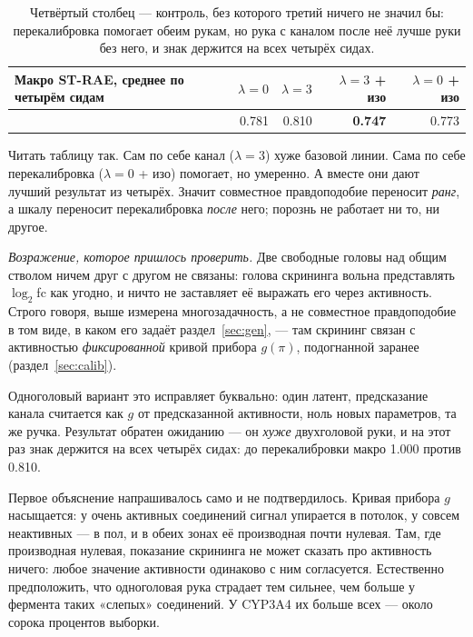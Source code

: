 \begin{table}[htbp]\centering\small
\begin{tabularx}{0.86\textwidth}{@{}Xrrrr@{}}
\toprule
Макро ST-RAE, среднее по четырём сидам & $\lambda=0$ & $\lambda=3$ & $\lambda=3$ + изо & $\lambda=0$ + изо \\
\midrule
& 0.781 & 0.810 & \textbf{0.747} & 0.773 \\
\bottomrule
\end{tabularx}
\caption{Четвёртый столбец --- контроль, без которого третий ничего не значил бы:
перекалибровка помогает обеим рукам, но рука с каналом после неё лучше руки без него,
и знак держится на всех четырёх сидах.}
\label{tab:joint}
\end{table}

Читать таблицу так. Сам по себе канал ($\lambda = 3$) хуже базовой линии. Сама по себе
перекалибровка ($\lambda = 0$ + изо) помогает, но умеренно. А вместе они дают лучший
результат из четырёх. Значит совместное правдоподобие переносит \emph{ранг}, а шкалу
переносит перекалибровка \emph{после} него; порознь не работает ни то, ни другое.

\emph{Возражение, которое пришлось проверить.} Две свободные головы над общим стволом ничем
друг с другом не связаны: голова скрининга вольна представлять $\log_2$fc как угодно, и
ничто не заставляет её выражать его через активность. Строго говоря, выше измерена
многозадачность, а не совместное правдоподобие в том виде, в каком его задаёт
раздел~\ref{sec:gen}, --- там скрининг связан с активностью \emph{фиксированной} кривой
прибора $g(\pi)$, подогнанной заранее (раздел~\ref{sec:calib}).

Одноголовый вариант это исправляет буквально: один латент, предсказание канала считается как
$g$ от предсказанной активности, ноль новых параметров, та же ручка. Результат обратен
ожиданию --- он \emph{хуже} двухголовой руки, и на этот раз знак держится на всех четырёх
сидах: до перекалибровки макро 1.000 против 0.810.

Первое объяснение напрашивалось само и не подтвердилось. Кривая прибора $g$
насыщается: у очень активных соединений сигнал упирается в потолок, у совсем неактивных --- в
пол, и в обеих зонах её производная почти нулевая. Там, где производная нулевая, показание
скрининга не может сказать про активность ничего: любое значение активности одинаково с ним
согласуется. Естественно предположить, что одноголовая рука страдает тем сильнее, чем больше у
фермента таких «слепых» соединений. У CYP3A4 их больше всех --- около сорока процентов
выборки.

